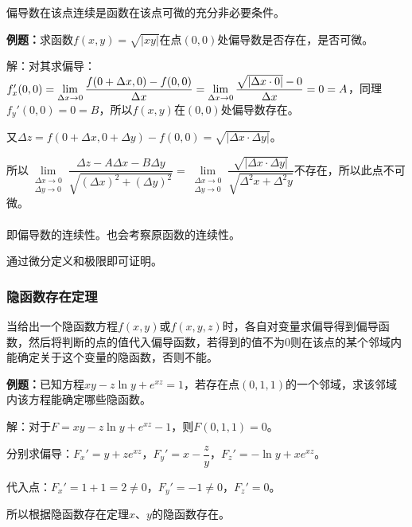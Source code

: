 偏导数在该点连续是函数在该点可微的充分非必要条件。

\textbf{例题：}求函数$f(x,y)=\sqrt{\vert xy\vert}$在点$(0,0)$处偏导数是否存在，是否可微。

解：对其求偏导：$f_x'(0,0)=\lim\limits_{\Delta x\to0}\dfrac{f(0+\Delta x,0)-f(0,0)}{\Delta x}=\lim\limits_{\Delta x\to0}\dfrac{\sqrt{\vert\Delta x\cdot0\vert}-0}{\Delta x}\\=0=A$，同理$f_y'(0,0)=0=B$，所以$f(x,y)$在$(0,0)$处偏导数存在。

又$\Delta z=f(0+\Delta x,0+\Delta y)-f(0,0)=\sqrt{\vert\Delta x\cdot\Delta y\vert}$。

所以$\lim\limits_{\substack{\Delta x\to0\\\Delta y\to0}}\dfrac{\Delta z-A\Delta x-B\Delta y}{\sqrt{(\Delta x)^2+(\Delta y)^2}}=\lim\limits_{\substack{\Delta x\to0\\\Delta y\to0}}\dfrac{\sqrt{\vert\Delta x\cdot\Delta y\vert}}{\sqrt{\Delta^2x+\Delta^2y}}$不存在，所以此点不可微。

\paragraph{} \leavevmode \medskip

即偏导数的连续性。也会考察原函数的连续性。

通过微分定义和极限即可证明。

\subsubsection{隐函数存在定理}

当给出一个隐函数方程$f(x,y)$或$f(x,y,z)$时，各自对变量求偏导得到偏导函数，然后将判断的点的值代入偏导函数，若得到的值不为0则在该点的某个邻域内能确定关于这个变量的隐函数，否则不能。

\textbf{例题：}已知方程$xy-z\ln y+e^{xz}=1$，若存在点$(0,1,1)$的一个邻域，求该邻域内该方程能确定哪些隐函数。

解：对于$F=xy-z\ln y+e^{xz}-1$，则$F(0,1,1)=0$。

分别求偏导：$F_x'=y+ze^{xz}$，$F_y'=x-\dfrac{z}{y}$，$F_z'=-\ln y+xe^{xz}$。

代入点：$F_x'=1+1=2\neq0$，$F_y'=-1\neq0$，$F_z'=0$。

所以根据隐函数存在定理$x$、$y$的隐函数存在。


